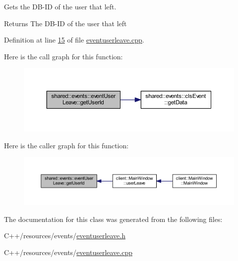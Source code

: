 Gets the D\-B-\/\-I\-D of the user that left. 

\begin{DoxyReturn}{Returns}
The D\-B-\/\-I\-D of the user that left 
\end{DoxyReturn}


Definition at line \hyperlink{eventuserleave_8cpp_source_l00015}{15} of file \hyperlink{eventuserleave_8cpp_source}{eventuserleave.\-cpp}.



Here is the call graph for this function\-:\nopagebreak
\begin{figure}[H]
\begin{center}
\leavevmode
\includegraphics[width=350pt]{d9/d9f/classshared_1_1events_1_1event_user_leave_afb9cb12d52415109349d1469f1577353_cgraph}
\end{center}
\end{figure}




Here is the caller graph for this function\-:
\nopagebreak
\begin{figure}[H]
\begin{center}
\leavevmode
\includegraphics[width=350pt]{d9/d9f/classshared_1_1events_1_1event_user_leave_afb9cb12d52415109349d1469f1577353_icgraph}
\end{center}
\end{figure}




The documentation for this class was generated from the following files\-:\begin{DoxyCompactItemize}
\item 
C++/resources/events/\hyperlink{eventuserleave_8h}{eventuserleave.\-h}\item 
C++/resources/events/\hyperlink{eventuserleave_8cpp}{eventuserleave.\-cpp}\end{DoxyCompactItemize}
